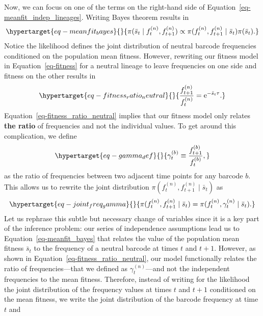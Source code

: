 \documentclass[
  letterpaper,
  DIV=11,
  numbers=noendperiod]{scrartcl}
\begin{document}
\begin{refsegment}
Now, we can focus on one of the terms on the right-hand side of
Equation~\ref{eq-meanfit_indep_lineages}. Writing Bayes theorem results
in \begin{equation}\protect\hypertarget{eq-meanfit_bayes}{}{
\pi(\bar{s}_t \mid f_t^{(n)}, f_{t+1}^{(n)}) \propto
\pi(f_t^{(n)}, f_{t+1}^{(n)} \mid \bar{s}_t) \pi(\bar{s}_t).
}\label{eq-meanfit_bayes}\end{equation} Notice the likelihood defines
the joint distribution of neutral barcode frequencies conditioned on the
population mean fitness. However, rewriting our fitness model in
Equation~\ref{eq-fitness} for a neutral lineage to leave frequencies on
one side and fitness on the other results in
\begin{equation}\protect\hypertarget{eq-fitness_ratio_neutral}{}{
\frac{f_{t+1}^{(n)}}{f_t^{(n)}} = \mathrm{e}^{- \bar{s}_t\tau}.
}\label{eq-fitness_ratio_neutral}\end{equation}
Equation~\ref{eq-fitness_ratio_neutral} implies that our fitness model
only relates \textbf{the ratio} of frequencies and not the individual
values. To get around this complication, we define
\begin{equation}\protect\hypertarget{eq-gamma_def}{}{
\gamma_t^{(b)} \equiv \frac{f_{t+1}^{(b)}}{f_t^{(b)}},
}\label{eq-gamma_def}\end{equation} as the ratio of frequencies between
two adjacent time points for any barcode \(b\). This allows us to
rewrite the joint distribution
\(\pi(f_t^{(n)}, f_{t+1}^{(n)} \mid \bar{s}_t)\) as
\begin{equation}\protect\hypertarget{eq-joint_freq_gamma}{}{
\pi(f_t^{(n)}, f_{t+1}^{(n)} \mid \bar{s}_t) =
\pi(f_t^{(n)}, \gamma_{t}^{(n)} \mid \bar{s}_t).
}\label{eq-joint_freq_gamma}\end{equation} Let us rephrase this subtle
but necessary change of variables since it is a key part of the
inference problem: our series of independence assumptions lead us to
Equation~\ref{eq-meanfit_bayes} that relates the value of the population
mean fitness \(\bar{s}_t\) to the frequency of a neutral barcode at
times \(t\) and \(t+1\). However, as shown in
Equation~\ref{eq-fitness_ratio_neutral}, our model functionally relates
the ratio of frequencies---that we defined as \(\gamma_t^{(n)}\)---and
not the independent frequencies to the mean fitness. Therefore, instead
of writing for the likelihood the joint distribution of the frequency
values at times \(t\) and \(t+1\) conditioned on the mean fitness, we
write the joint distribution of the barcode frequency at time \(t\) and

\end{refsegment}
\end{document}
